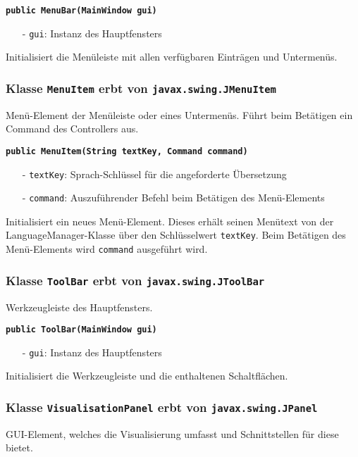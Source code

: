 \documentclass[parskip=full,11pt,twoside]{scrartcl}
\begin{document}
\textbf{\texttt{public MenuBar(MainWindow gui)}}
\begin{itemize}[noitemsep]
	\item[-] \texttt{gui}: Instanz des Hauptfensters
\end{itemize}
Initialisiert die Menüleiste mit allen verfügbaren Einträgen und Untermenüs.

\subsubsection{Klasse \texttt{MenuItem} erbt von \texttt{javax.swing.JMenuItem}}

Menü-Element der Menüleiste oder eines Untermenüs. Führt beim Betätigen ein Command des Controllers aus.

\textbf{\texttt{public MenuItem(String textKey, Command command)}}
\begin{itemize}[noitemsep]
	\item[-] \texttt{textKey}: Sprach-Schlüssel für die angeforderte Übersetzung
	\item[-] \texttt{command}: Auszuführender Befehl beim Betätigen des Menü-Elements
\end{itemize}
Initialisiert ein neues Menü-Element. Dieses erhält seinen Menütext von der LanguageManager-Klasse über den Schlüsselwert \texttt{textKey}. Beim Betätigen des Menü-Elements wird \texttt{command} ausgeführt wird.

\subsubsection{Klasse \texttt{ToolBar} erbt von \texttt{javax.swing.JToolBar}}

Werkzeugleiste des Hauptfensters.

\textbf{\texttt{public ToolBar(MainWindow gui)}}
\begin{itemize}[noitemsep]
	\item[-] \texttt{gui}: Instanz des Hauptfensters
\end{itemize}
Initialisiert die Werkzeugleiste und die enthaltenen Schaltflächen.

\subsubsection{Klasse \texttt{VisualisationPanel} erbt von \texttt{javax.swing.JPanel}}

GUI-Element, welches die Visualisierung umfasst und Schnittstellen für diese bietet.
\end{document}
